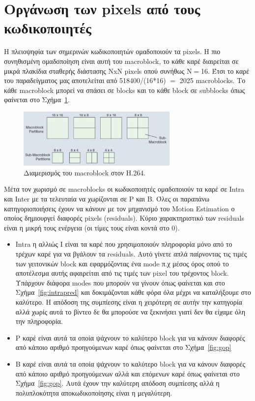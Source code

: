 \newpage
\section{Οργάνωση των pixels από τους κωδικοποιητές}
\label{section:sect23}

\indent Η πλειοψηφία των σημερινών κωδικοποιητών ομαδοποιούν τα pixels. Η πιο συνηθισμένη ομαδοποίηση είναι αυτή του macroblock, το κάθε καρέ διαιρείται σε μικρά πλακίδια σταθερής διάστασης NxN pixels οπού συνήθως N$=$16. Έτσι το καρέ του παραδείγματος μας αποτελείται από 518400/(16*16) $=$ 2025 macroblocks. Το κάθε macroblock μπορεί να σπάσει σε blocks και το κάθε block σε subblocks όπως φαίνεται στο Σχήμα~\ref{fig:mbpart}.

\begin{figure}[H]
  \centering
    \includegraphics[width=0.7\textwidth]{chapter2/mbpart.jpg}
  \caption{Διαμερισμός του macroblock στον H.264.}
  \label{fig:mbpart}
\end{figure}

\indent Μέτα τον χωρισμό σε macroblocks οι κωδικοποιητές ομαδοποιούν τα καρέ σε Intra και Inter με τα τελευταία να χωρίζονται σε P και Β. Όλες οι παραπάνω κατηγοριοποιήσεις έχουν να κάνουν με τον μηχανισμό του Motion Estimation ο οποίος δημιουργεί διαφορές pixels (residuals). Κύριο χαρακτηριστικό των residuals είναι η μικρή τους ενέργεια (οι τίμες τους είναι κοντά στο 0).

\begin{itemize}
  \item Intra η αλλιώς I είναι τα καρέ που χρησιμοποιούν πληροφορία μόνο από το τρέχων καρέ για να βγάλουν τα residuals. Αυτό γίνετε απλά παίρνοντας τις τιμές των γειτονικών block και εφαρμόζοντας ένα mode π.χ μέσος όρος οπού το αποτέλεσμα αυτής αφαιρείται από τις τιμές των pixel του τρέχοντος block. Υπάρχουν διάφορα modes που μπορούν να γίνουν όπως φαίνεται και στο Σχήμα~\ref{fig:intrapred} και δοκιμάζονται κάθε φόρα όλα μέχρι να καταλήξουμε στο καλύτερο. Η απόδοση της συμπίεσης είναι η χειρότερη σε αυτήν την κατηγορία αλλά χωρίς αυτά το βίντεο δε θα μπορούσε να ξεκινήσει γιατί δεν θα είχαμε όλη την πληροφορία.

  \item P καρέ είναι αυτά τα οποία ψάχνουν το καλύτερο block για να κάνουν διαφορές από κάποιο αριθμό προηγούμενων καρέ όπως φαίνεται στο Σχήμα~\ref{fig:gop}

  \item Β καρέ είναι αυτά τα οποία ψάχνουν το καλύτερο block για να κάνουν διαφορές από κάποιο αριθμό προηγούμενων αλλά και επόμενων καρέ όπως φαίνεται στο Σχήμα~\ref{fig:gop}. Αυτά έχουν την καλύτερη απόδοση συμπίεσης αλλά η πολυπλοκότητα αποκωδικοποίησης είναι η μεγαλύτερη.
\end{itemize}

